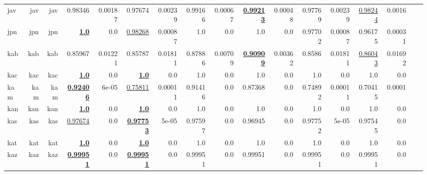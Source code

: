 \documentclass[11pt]{article}
\begin{document}
\begin{table*}[h]
{\begin{tabular}{lrrrrrrrrrrrrrrrr}
jav         & jav         & jav         & 0.98346         & 0.00187         & 0.97674         & 0.00239         & 0.99166         & 0.00067         & \textbf{\underline{0.99213}}         & 0.00048         & 0.97769         & 0.00239         & \underline{0.98244}         & 0.0016         \\
jpn         & jpn         & jpn         & \textbf{\underline{1.0}}         & 0.0         & \underline{0.98268}         & 0.00087         & 1.0         & 0.0         & 1.0         & 0.0         & 0.97702         & 0.00087         & 0.96175         & 0.00031         \\
kab         & kab         & kab         & 0.85967         & 0.01221         & 0.85787         & 0.01811         & 0.87886         & 0.00709         & \textbf{\underline{0.90909}}         & 0.00362         & 0.8586         & 0.01811         & \underline{0.86043}         & 0.01692         \\
kac         & kac         & kac         & \textbf{\underline{1.0}}         & 0.0         & \textbf{\underline{1.0}}         & 0.0         & 1.0         & 0.0         & 1.0         & 0.0         & 1.0         & 0.0         & 1.0         & 0.0         \\
kam         & kam         & kam         & \textbf{\underline{0.92406}}         & 6e-05         & \underline{0.75811}         & 0.00011         & 0.91416         & 0.0         & 0.87368         & 0.0         & 0.74892         & 0.00011         & 0.70415         & 0.0001         \\
kan         & kan         & kan         & \textbf{\underline{1.0}}         & 0.0         & \textbf{\underline{1.0}}         & 0.0         & 1.0         & 0.0         & 1.0         & 0.0         & 1.0         & 0.0         & 1.0         & 0.0         \\
kas         & kas         & kas         & \underline{0.97674}         & 0.0         & \textbf{\underline{0.97753}}         & 5e-05         & 0.97597         & 0.0         & 0.96945         & 0.0         & 0.97752         & 5e-05         & 0.97545         & 0.0         \\
kat         & kat         & kat         & \textbf{\underline{1.0}}         & 0.0         & \textbf{\underline{1.0}}         & 0.0         & 1.0         & 0.0         & 1.0         & 0.0         & 1.0         & 0.0         & 1.0         & 0.0         \\
kaz         & kaz         & kaz         & \textbf{\underline{0.99951}}         & 0.0         & \textbf{\underline{0.99951}}         & 0.0         & 0.99951         & 0.0         & 0.99951         & 0.0         & 0.99951         & 0.0         & 0.99951         & 0.0         \\

\end{tabular}}
\end{table*}
\end{document}
